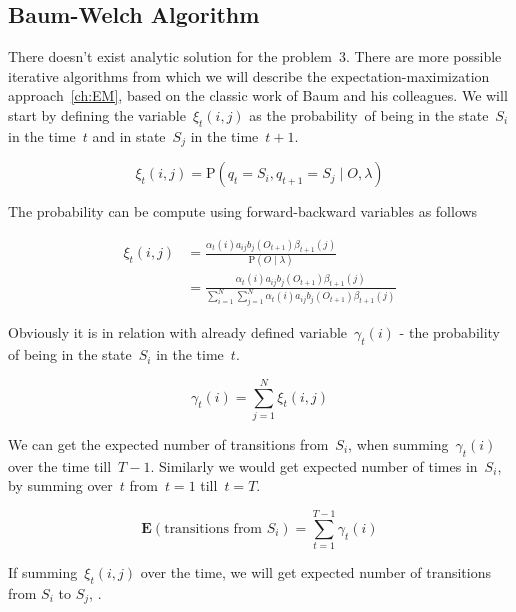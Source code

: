 \documentclass[thesis=M,english]{FITthesis}[2012/10/20]
\begin{document}
\subsection{Baum-Welch Algorithm}\label{sec:BWA}

There doesn't exist analytic solution for the problem~3. There are more possible iterative algorithms from which we will describe the expectation-maximization approach~\ref{ch:EM}, based on the classic work of Baum and his colleagues. We will start by defining the variable~$\xi_t(i,j)$ as the probability~of being in the state~$S_i$ in the time~$t$ and in state~$S_j$ in the time~$t+1$. 

\begin{equation}
\xi_t(i,j) = \mathrm{P}( q_t = S_i, q_{t+1} = S_j \mid O, \lambda )  
\end{equation}

The probability can be compute using forward-backward variables as follows
 
\begin{equation}\label{eq:xi}
\begin{aligned}
\xi_t(i,j) &= \frac{ \alpha_t(i) a_{ij} b_j(O_{t+1}) \beta_{t+1}(j) }
		   		   { \mathrm{P}( O \mid \lambda ) } \\
		   &= \frac{ \alpha_t(i) a_{ij} b_j(O_{t+1}) \beta_{t+1}(j) }
		   		   { \sum\limits_{i=1}^N \sum\limits_{j=1}^N \alpha_t(i) a_{ij} b_j(O_{t+1}) \beta_{t+1}(j) }
\end{aligned}
\end{equation}

Obviously it is in relation with already defined variable~$\gamma_t(i)$ - the probability of being in the state~$S_i$ in the time~$t$.

\begin{equation}
\gamma_t(i) = \sum_{j=1}^N \xi_t(i,j)  
\end{equation}

We can get the expected number of transitions from~$S_i$, when summing~$\gamma_t(i)$ over the time till~$T-1$. Similarly we would get expected number of times in~$S_i$, by summing over~$t$ from~$t=1$ till~$t=T$. 

\begin{equation}
\mathbf{E}(\text{transitions from $S_i$}) = \sum_{t=1}^{T-1} \gamma_t(i)  
\end{equation}

If summing~$\xi_t(i,j)$ over the time, we will get expected number of transitions from $S_i$ to $S_j$, . 
\end{document}
